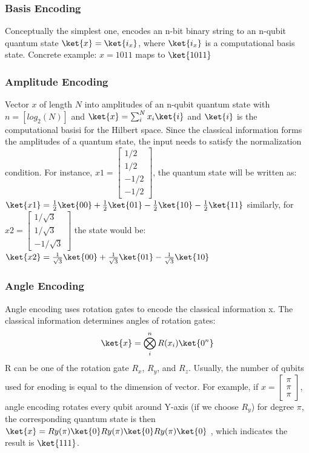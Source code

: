 \subsubsection*{Basis Encoding}
Conceptually the simplest one, encodes an n-bit binary string to an n-qubit 
quantum state $\ket{x} = \ket{i_x}$, where $\ket{i_x}$ is a computational
basis state. Concrete example: $ x =1011 $ maps to $\ket{1011}$

\subsubsection*{Amplitude Encoding}
Vector $x$ of length $N$ into amplitudes of an n-qubit quantum 
state with $n = [log_2(N)]$ and $
  \ket{x} = \sum^N_i x_i \ket{i} $
and $\ket{i}$ is the computational basisi for the Hilbert space. Since 
the classical information forms the amplitudes of a quantum state, the 
input needs to satisfy the normalization condition. For instance, 
$x1 = \begin{bmatrix}
  1/2 \\ 1/2 \\ -1/2 \\-1/2
\end{bmatrix}$, the quantum state will be written as: 
$\ket{x1} = \frac{1}{2} \ket{00} + \frac{1}{2} 
\ket{01} - \frac{1}{2} \ket{10} - \frac{1}{2} \ket{11}$
similarly, for $x2 = \begin{bmatrix}
  1/\sqrt{3} \\ 1/\sqrt{3} \\ -1/\sqrt{3} 
\end{bmatrix}$ the state would be:
$\ket{x2} = \frac{1}{\sqrt{3}} \ket{00} 
+ \frac{1}{\sqrt{3}} \ket{01} - \frac{1}{\sqrt{3}} \ket{10} $

\subsubsection*{Angle Encoding}
Angle encoding uses rotation gates to encode the classical information x. 
The classical information determines angles of rotation gates:
\begin{equation}
  \ket{x} = \bigotimes_i^n R(x_i) \ket{0^n}
\end{equation}
R can be one of the rotation gate $R_x$, $R_y$, and $R_z$. Usually, the 
number of qubits used for enoding is equal to the dimension of vector. For example, 
if $x = \begin{bmatrix}
  \pi \\ \pi \\ \pi 
\end{bmatrix}$, angle encoding rotates every qubit around Y-axis (if we choose $R_y$)
for degree $\pi$, the corresponding quantum state is then $\ket{x} = Ry(\pi) \ket{0} Ry(\pi) \ket{0} Ry(\pi) \ket{0}$
, which indicates the result is $\ket{111}$.

